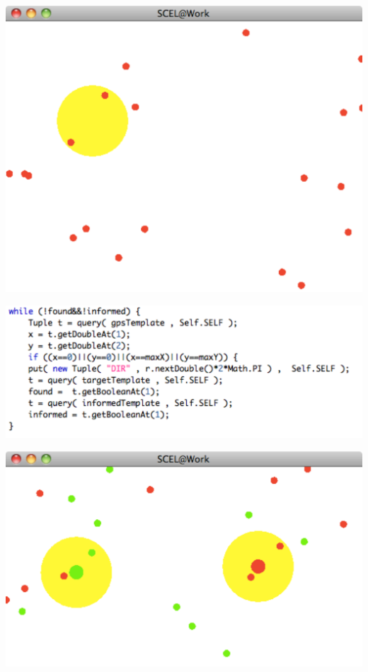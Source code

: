 \documentclass[11pt]{article}
\begin{document}
\begin{center}
\includegraphics[scale=0.25]{img/scenariosimple}
\end{center}

\begin{center}
\includegraphics[scale=0.5]{img/pieceofcode}
\end{center}

\begin{center}
\includegraphics[scale=0.45]{img/doublemobility}
\end{center}
\end{document}
